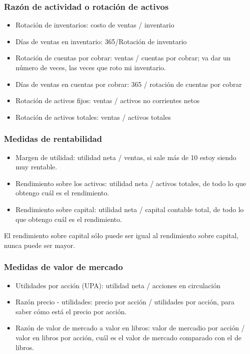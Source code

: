 \subsubsection{Razón de actividad o rotación de activos}
\begin{itemize}
    \item Rotación de inventarios: costo de ventas / inventario 
    \item Días de ventas en inventario: 365/Rotación de inventario 
    \item Rotación de cuentas por cobrar: ventas  / cuentas por cobrar; va dar un número de veces, las veces que roto mi inventario. 
    \item Días de ventas en cuentas por cobrar: 365 / rotación de cuentas por cobrar 
    \item Rotación de activos fijos: ventas / activos no corrientes netos 
    \item Rotación de activos totales: ventas / activos totales 
\end{itemize}

\subsubsection{Medidas de rentabilidad}
\begin{itemize}
    \item Margen de utilidad: utilidad neta / ventas, si sale más de 10 estoy siendo muy rentable. 
    \item Rendimiento sobre los activos: utilidad neta / activos totales, de todo lo que obtengo cuál es el rendimiento. 
    \item Rendimiento sobre capital: utilidad neta / capital contable total, de todo lo que obtengo cuál es el rendimiento.  
\end{itemize}
El rendimiento sobre capital sólo puede ser igual al rendimiento sobre capital, nunca puede ser mayor. 


\subsubsection{Medidas de valor de mercado}
\begin{itemize}
    \item Utilidades por acción (UPA): utilidad neta / acciones en circulación 
    \item Razón precio - utilidades: precio por acción / utilidades por acción, para saber cómo está el precio por acción. 
    \item Razón de valor de mercado a valor en libros: valor de mercadio por acción / valor en libros por acción, cuál es el valor de mercado comparado con el de libros. 
\end{itemize}


